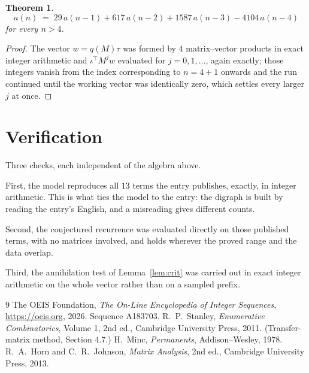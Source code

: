 \documentclass[11pt,a4paper]{article}
\theoremstyle{plain}
\newtheorem{theorem}{Theorem}
\theoremstyle{definition}
\begin{document}
\begin{theorem}
\[
a(n)\;=\;29\,a(n-1) + 617\,a(n-2) + 1587\,a(n-3) - 4104\,a(n-4)
\]
for every $n>4$.
\end{theorem}

\begin{proof}
The vector $w=q(M)\tau$ was formed by $4$ matrix--vector products in exact integer
arithmetic and $\iota^{\!\top}M^{j}w$ evaluated for $j=0,1,\dots$, again exactly; those
integers vanish from the index corresponding to $n=4+1$ onwards and the run continued
until the working vector was identically zero, which settles every larger $j$ at once.
\end{proof}

\section{Verification}

Three checks, each independent of the algebra above.

First, the model reproduces all $13$ terms the entry publishes, exactly, in integer
arithmetic. This is what ties the model to the entry: the digraph is built by reading the
entry's English, and a misreading gives different counts.

Second, the conjectured recurrence was evaluated directly on those published terms, with no
matrices involved, and holds wherever the proved range and the data overlap.

Third, the annihilation test of Lemma~\ref{lem:crit} was carried out in exact integer
arithmetic on the whole vector rather than on a sampled prefix.

\begin{thebibliography}{9}
 The OEIS Foundation, \emph{The On-Line Encyclopedia of Integer
Sequences}, \url{https://oeis.org}, 2026. Sequence A183703.
 R.~P.~Stanley, \emph{Enumerative Combinatorics}, Volume 1, 2nd ed.,
Cambridge University Press, 2011. (Transfer-matrix method, Section 4.7.)
 H.~Minc, \emph{Permanents}, Addison--Wesley, 1978.
 R.~A.~Horn and C.~R.~Johnson, \emph{Matrix Analysis}, 2nd ed., Cambridge
University Press, 2013.
\end{thebibliography}
\end{document}
